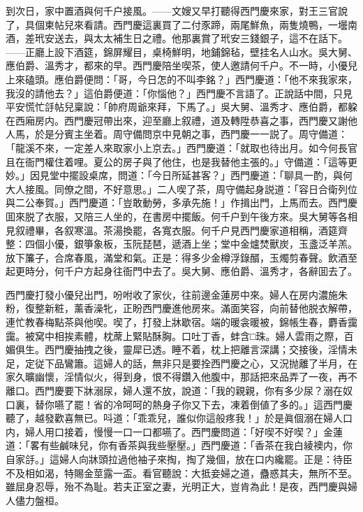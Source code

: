 到次日，家中置酒與何千户接風。——文嫂又早打聽得西門慶來家，對王三官說了，具個柬帖兒來看請。西門慶這裏買了二付豕蹄，兩尾鮮魚，兩隻燒鴨，一壜南酒，差玳安送去，與太太補生日之禮。他那裏賞了玳安三錢銀子，這不在話下。——正廳上設下酒筵，錦屏耀目，桌椅鮮明，地鋪錦毡，壁挂名人山水。吳大舅、應伯爵、溫秀才，都來的早。西門慶陪坐喫茶，使人邀請何千户。不一時，小優兒上來磕頭。應伯爵便問：「哥，今日怎的不叫李銘？」西門慶道：「他不來我家來，我沒的請他去？」這伯爵便道：「你惱他？」西門慶不言語了。正說話中間，只見平安慌忙㧱帖兒稟說：「帥府周爺來拜，下馬了。」吳大舅、溫秀才、應伯爵，都躱在西廂房内。西門慶冠帶出來，迎至廳上叙禮，道及轉陞恭喜之事，西門慶又謝他人馬，於是分賓主坐着。周守備問京中見朝之事，西門慶一一説了。周守備道：「龍溪不來，一定差人來取家小上京去。」西門慶道：「就取也待出月。如今何長官且在衙門權住着哩。夏公的房子與了他住，也是我替他主張的。」守備道：「這等更妙。」因見堂中擺設桌席，問道：「今日所延甚客？」西門慶道：「聊具一酌，與何大人接風。同僚之間，不好意思。」二人喫了茶，周守備起身説道：「容日合衛列位與二公奉賀。」西門慶道：「豈敢動勞，多承先施！」作揖出門，上馬而去。西門慶囬來脱了衣服，又陪三人坐的，在書房中擺飯。何千户到午後方來。吳大舅等各相見叙禮畢，各叙寒溫。茶湯換罷，各寬衣服。何千户見西門慶家道相稱，酒筵齊整：四個小優，銀箏象板，玉阮琵琶，遞酒上坐；堂中金爐焚獸炭，玉盞泛羊羔。放下簾子，合席春風，滿堂和氣。正是：得多少金樽浮錄醑，玉燭剪春聲。飲酒至起更時分，何千户方起身往衙門中去了。吳大舅、應伯爵、溫秀才，各辭囬去了。

西門慶打發小優兒出門，吩咐收了家伙，往前邊金蓮房中來。婦人在房内濃施朱粉，復整新粧，薰香澡牝，正盼西門慶進他房來。滿面笑容，向前替他脱衣解帶，連忙教春梅點茶與他喫。喫了，打發上牀歇宿。端的暖衾暖被，錦帳生春，麝香靄靄。被窝中相挨素體，枕蓆上緊貼酥胸。口吐丁香，蚌含□珠。婦人雲雨之際，百媚俱生。西門慶抽拽之後，靈犀已透。睡不着，枕上把離言深講；交接後，淫情未足，定従下品鸞簫。這婦人的話，無非只是要拴西門慶之心，又況抛離了半月，在家久曠幽懷，淫情似火，得到身，恨不得鑽入他腹中，那話把來品弄了一夜，再不離口。西門慶要下牀溺尿，婦人還不放，說道：「我的親親，你有多少尿？溺在奴口裏，替你嚥了罷！省的冷呵呵的熱身子你又下去，凍着倒値了多的。」這西門慶聽了，越發歡喜無已。呌道：「乖乖兒，誰似你這般疼我！」於是眞個溺在婦人口内，婦人用口接着，慢慢一口一口都嚥了。西門慶問道：「好喫不好喫？」金蓮道：「畧有些鹹味兒，你有香茶與我些壓壓。」西門慶道：「香茶在我白綾襖内，你自家㧱。」這婦人向牀頭拉過他袖子來掏，掏了幾個，放在口内纔罷。正是：待臣不及相如渴，特賜金莖露一盃。看官聽說：大抵妾婦之道，蠱惑其夫，無所不至。雖屈身忍辱，殆不為耻。若夫正室之妻，光明正大，豈肯為此！是夜，西門慶與婦人儘力盤桓。

